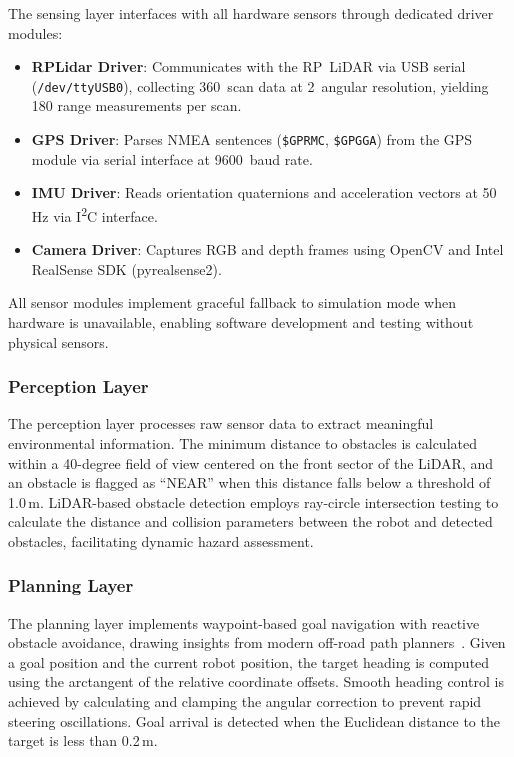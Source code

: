 \documentclass[conference]{IEEEtran}
\begin{document}
The sensing layer interfaces with all hardware sensors through dedicated driver modules:

\begin{itemize}
    \item \textbf{RPLidar Driver}: Communicates with the RP~LiDAR via USB serial (\texttt{/dev/ttyUSB0}), collecting 360\textdegree\ scan data at 2\textdegree\ angular resolution, yielding 180 range measurements per scan.
    \item \textbf{GPS Driver}: Parses NMEA sentences (\texttt{\$GPRMC}, \texttt{\$GPGGA}) from the GPS module via serial interface at 9600~baud rate.
    \item \textbf{IMU Driver}: Reads orientation quaternions and acceleration vectors at 50\,Hz via I\textsuperscript{2}C interface.
    \item \textbf{Camera Driver}: Captures RGB and depth frames using OpenCV and Intel RealSense SDK (pyrealsense2).
\end{itemize}

All sensor modules implement graceful fallback to simulation mode when hardware is unavailable, enabling software development and testing without physical sensors.

\subsubsection{Perception Layer}

The perception layer processes raw sensor data to extract meaningful environmental information. The minimum distance to obstacles is calculated within a 40-degree field of view centered on the front sector of the LiDAR, and an obstacle is flagged as ``NEAR'' when this distance falls below a threshold of 1.0\,m. LiDAR-based obstacle detection employs ray-circle intersection testing to calculate the distance and collision parameters between the robot and detected obstacles, facilitating dynamic hazard assessment.

\subsubsection{Planning Layer}

The planning layer implements waypoint-based goal navigation with reactive obstacle avoidance, drawing insights from modern off-road path planners~\cite{jiang2024risk, mukherjee2025terrain}. Given a goal position and the current robot position, the target heading is computed using the arctangent of the relative coordinate offsets. Smooth heading control is achieved by calculating and clamping the angular correction to prevent rapid steering oscillations. Goal arrival is detected when the Euclidean distance to the target is less than 0.2\,m.
\end{document}
